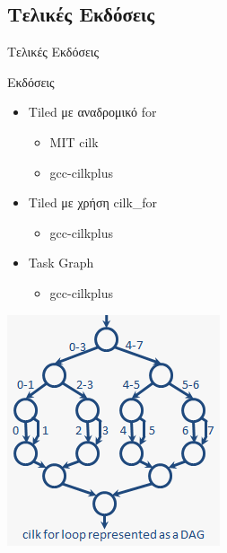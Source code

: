 \documentclass{beamer}
\begin{document}
\subsection{Τελικές Εκδόσεις}
\begin{frame}{Τελικές Εκδόσεις}
    \begin{block}{Εκδόσεις }
        \begin{minipage}{0.7\textwidth}
            \begin{itemize}
                \item<1->
                    Tiled με αναδρομικό for
                    \begin{itemize}
                        \item<2-> MIT cilk
                        \item<3-> gcc-cilkplus
                    \end{itemize}
                \item<4-> Tiled με χρήση cilk\_for
                    \begin{itemize}
                        \item<5-> gcc-cilkplus
                    \end{itemize}
                \item<6-> Task Graph
                    \begin{itemize}
                        \item<7-> gcc-cilkplus
                    \end{itemize}
            \end{itemize}
        \end{minipage}
        \begin{minipage}[H!]{0.1\textwidth}
            \begin{flushright}
                \includegraphics[scale=0.45]{files/rec_for.png}
            \end{flushright}
        \end{minipage}
    \end{block}
\end{frame}
\end{document}
